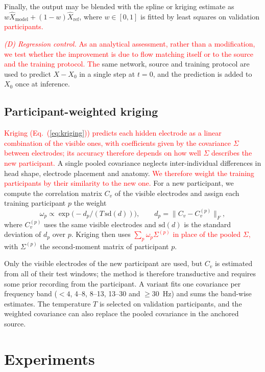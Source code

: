 \documentclass{article}
\begin{document}
Finally, the output may be blended with the spline or kriging estimate as
$w\hat X_{\mathrm{model}}+(1-w)\hat X_{\mathrm{ref}}$, where $w\in[0,1]$
is fitted by least squares on validation \textcolor{red}{participants.}

\textcolor{red}{\emph{(D) Regression control.} As an analytical assessment, rather than a
modification, we test whether the improvement is due to flow matching
itself or to the source and the training protocol. The} same network,
source and training protocol are used to predict $X-X_0$ in a single step
at $t=0$, and the prediction is added to $X_0$ once at inference.

\subsection{Participant-weighted kriging}

\textcolor{red}{Kriging (Eq.~(\ref{eq:kriging})) predicts each hidden electrode as a linear combination of
the visible ones, with coefficients given by the covariance $\Sigma$
between electrodes; its accuracy therefore depends on how well $\Sigma$
describes the new participant.} A single pooled covariance neglects
inter-individual differences in head shape, electrode placement and
anatomy. \textcolor{red}{We therefore weight the training participants by their
similarity to the new one.} For a new participant, we compute the
correlation matrix $C_v$ of the visible electrodes and assign each
training participant $p$ the weight
\begin{equation}
\omega_p\propto\exp\!\big(-d_p/(T\,\mathrm{sd}(d))\big),\qquad
d_p=\|C_v-C^{(p)}_v\|_F,
\end{equation}
where $C^{(p)}_v$ uses the same visible electrodes and $\mathrm{sd}(d)$ is
the standard deviation of $d_p$ over $p$. Kriging then uses
\textcolor{red}{$\sum_p\omega_p\Sigma^{(p)}$ in place of the pooled $\Sigma$,} with
$\Sigma^{(p)}$ the second-moment matrix of participant $p$.

Only the visible electrodes of the new participant are used, but $C_v$ is
estimated from all of their test windows; the method is therefore
transductive and requires some prior recording from the participant. A
variant fits one covariance per frequency band ($<4$, 4--8, 8--13, 13--30
and $\geq$30~Hz) and sums the band-wise estimates. The temperature $T$ is
selected on validation participants, and the weighted covariance can also
replace the pooled covariance in the anchored source.

\section{Experiments}
\label{sec:experiments}
\end{document}
